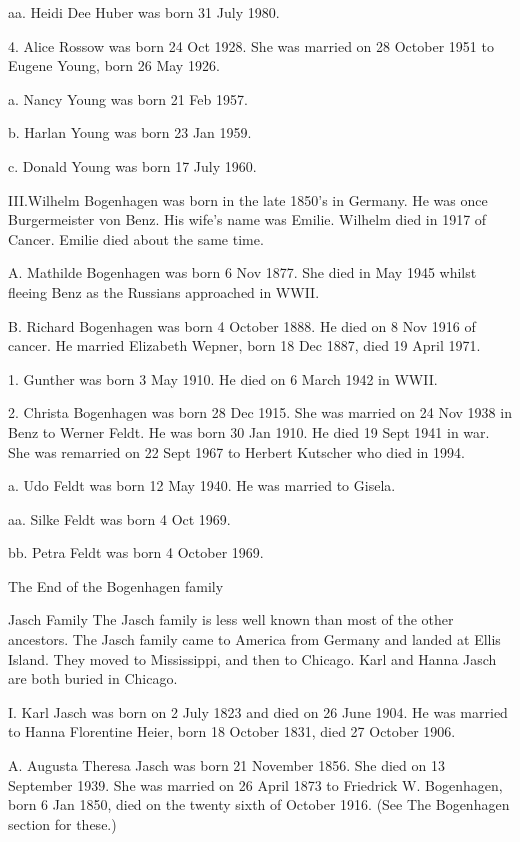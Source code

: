 \documentclass[a4paper]{article}
\begin{document}
aa. Heidi Dee Huber was born 31 July 1980.

4. Alice Rossow was born 24 Oct 1928.  She was married on 28 October 1951 to Eugene Young, born 26 May 1926.
		 
a. Nancy Young was born 21 Feb 1957.

b. Harlan Young was born 23 Jan 1959.

c. Donald Young was born 17 July 1960.

III.Wilhelm Bogenhagen was born in the late 1850's in Germany.  He was once Burgermeister von Benz.  His wife's name was Emilie.  Wilhelm died in 1917 of Cancer.  Emilie died about the same time.

A. Mathilde Bogenhagen was born 6 Nov 1877.  She died in May 1945 whilst fleeing Benz as the Russians approached in WWII.
 
B. Richard Bogenhagen was born 4 October 1888.  He died on 8 Nov 1916 of cancer.  He married Elizabeth Wepner, born 18 Dec 1887, died 19 April 1971.  
 
1. Gunther was born 3 May 1910.  He died on 6 March 1942 in WWII.

2. Christa Bogenhagen was born 28 Dec 1915.  She was married on 24 Nov 1938 in Benz to Werner Feldt.  He was born 30 Jan 1910. He died 19 Sept 1941 in war. She was remarried on 22 Sept 1967 to Herbert Kutscher who died in 1994. 

a. Udo Feldt was born 12 May 1940.  He was married to Gisela.

aa. Silke Feldt was born 4 Oct 1969.

bb. Petra Feldt was born 4 October 1969.
	
\vskip 4mm
The End of the Bogenhagen family


\pagebreak

{\Huge \noindent Jasch Family}
\vskip 5mm
	The Jasch family is less well known than most of the other ancestors. The Jasch family came to America from Germany and landed at Ellis Island.  They moved to Mississippi, and then to Chicago.  Karl and Hanna Jasch are both buried in Chicago.  

I.  Karl Jasch was born on 2 July 1823 and died on 26 June 1904.  He was married to Hanna 
Florentine Heier, born 18 October 1831, died 27 October 1906.
 
A. Augusta Theresa Jasch was born 21 November 1856.  She died on 13 September 1939. She was married on 26 April 1873 to Friedrick W. Bogenhagen, born 6 Jan 1850, died on the twenty sixth of	 October 1916.  (See The Bogenhagen section for these.)
 
\end{document}
